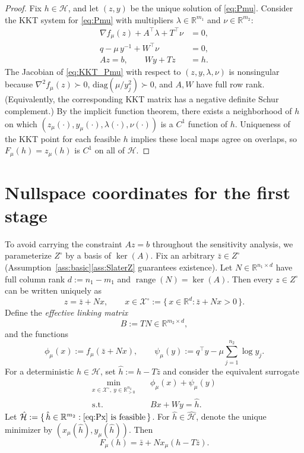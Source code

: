 \documentclass[11pt]{article}
\newcommand{\R}{\mathbb{R}}
\DeclareMathOperator{\range}{range}
\theoremstyle{plain}
\theoremstyle{definition}
\begin{document}
\begin{proof}
Fix $h\in\mathcal{H}$, and let $(z,y)$ be the unique solution of \eqref{eq:Pmu}.
Consider the KKT system for \eqref{eq:Pmu} with multipliers $\lambda\in\R^{m_1}$ and $\nu\in\R^{m_2}$:
\begin{equation}\label{eq:KKT_Pmu}
\begin{aligned}
\nabla f_\mu(z) + A^\top\lambda + T^\top \nu &= 0,\\
q - \mu\,y^{-1} + W^\top \nu &= 0,\\
Az=b,\qquad Wy+Tz &= h.
\end{aligned}
\end{equation}
The Jacobian of \eqref{eq:KKT_Pmu} with respect to $(z,y,\lambda,\nu)$ is nonsingular because
$\nabla^2 f_\mu(z)\succ 0$, $\mathrm{diag}(\mu/y_j^2)\succ 0$, and $A,W$ have full row rank.
(Equivalently, the corresponding KKT matrix has a negative definite Schur complement.)
By the implicit function theorem, there exists a neighborhood of $h$ on which
$(z_\mu(\cdot),y_\mu(\cdot),\lambda(\cdot),\nu(\cdot))$ is a $C^1$ function of $h$.
Uniqueness of the KKT point for each feasible $h$ implies these local maps agree on overlaps,
so $F_\mu(h)=z_\mu(h)$ is $C^1$ on all of $\mathcal{H}$.
\end{proof}

\section{Nullspace coordinates for the first stage}

To avoid carrying the constraint $Az=b$ throughout the sensitivity analysis, we parameterize $Z^\circ$
by a basis of $\ker(A)$.
Fix an arbitrary $\bar z\in Z^\circ$ (Assumption~\ref{ass:basic}\ref{ass:SlaterZ} guarantees existence).
Let $N\in\R^{n_1\times d}$ have full column rank $d:=n_1-m_1$ and $\range(N)=\ker(A)$.
Then every $z\in Z^\circ$ can be written uniquely as
\begin{equation}\label{eq:param}
z=\bar z + N x,\qquad x\in\mathcal{X}^\circ := \{\,x\in\R^d : \bar z+Nx>0\,\}.
\end{equation}
Define the \emph{effective linking matrix}
\begin{equation}\label{eq:B}
B := TN\in\R^{m_2\times d},
\end{equation}
and the functions
\[
\phi_\mu(x):= f_\mu(\bar z+Nx),\qquad
\psi_\mu(y):= q^\top y - \mu\sum_{j=1}^{n_2}\log y_j.
\]
For a deterministic $h\in\mathcal{H}$, set $\hat h := h - T\bar z$ and consider the equivalent surrogate
\begin{equation}\label{eq:Px}
\begin{aligned}
\min_{x\in\mathcal{X}^\circ,\ y\in\R^{n_2}_{>0}}\quad & \phi_\mu(x) + \psi_\mu(y)\\
\text{s.t.}\quad & Bx + Wy = \hat h.
\end{aligned}
\end{equation}
Let $\hat{\mathcal{H}}:=\{\,\hat h\in\R^{m_2}: \text{\eqref{eq:Px} is feasible}\,\}$.
For $\hat h\in\hat{\mathcal{H}}$, denote the unique minimizer by $(x_\mu(\hat h),y_\mu(\hat h))$.
Then
\begin{equation}\label{eq:relateF}
F_\mu(h) = \bar z + N x_\mu(h-T\bar z).
\end{equation}
\end{document}
